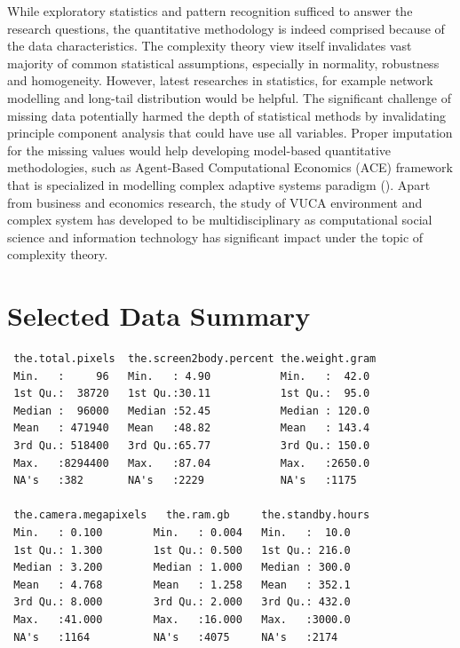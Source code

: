 \documentclass[utf8,english]{gradu3}
\begin{document}
While exploratory statistics and pattern recognition sufficed to answer the research questions, the quantitative methodology is indeed comprised because of the data characteristics. The complexity theory view itself invalidates vast majority of common statistical assumptions, especially in normality, robustness and homogeneity. However, latest researches in statistics, for example network modelling and long-tail distribution would be helpful. The significant challenge of missing data potentially harmed the depth of statistical methods by invalidating principle component analysis that could have use all variables. Proper imputation for the missing values would help developing model-based quantitative methodologies, such as Agent-Based Computational Economics (ACE) framework that is specialized in modelling complex adaptive systems paradigm (\cite{tesfatsion2003agent}). Apart from business and economics research, the study of VUCA environment and complex system has developed to be multidisciplinary as computational social science and information technology has significant impact under the topic of complexity theory.

\printbibliography

\appendix

\section{Selected Data Summary}
\label{app:data summary}
\begin{verbatim}
 the.total.pixels  the.screen2body.percent the.weight.gram 
 Min.   :     96   Min.   : 4.90           Min.   :  42.0  
 1st Qu.:  38720   1st Qu.:30.11           1st Qu.:  95.0  
 Median :  96000   Median :52.45           Median : 120.0  
 Mean   : 471940   Mean   :48.82           Mean   : 143.4  
 3rd Qu.: 518400   3rd Qu.:65.77           3rd Qu.: 150.0  
 Max.   :8294400   Max.   :87.04           Max.   :2650.0  
 NA's   :382       NA's   :2229            NA's   :1175    
 
 the.camera.megapixels   the.ram.gb     the.standby.hours
 Min.   : 0.100        Min.   : 0.004   Min.   :  10.0   
 1st Qu.: 1.300        1st Qu.: 0.500   1st Qu.: 216.0   
 Median : 3.200        Median : 1.000   Median : 300.0   
 Mean   : 4.768        Mean   : 1.258   Mean   : 352.1   
 3rd Qu.: 8.000        3rd Qu.: 2.000   3rd Qu.: 432.0   
 Max.   :41.000        Max.   :16.000   Max.   :3000.0   
 NA's   :1164          NA's   :4075     NA's   :2174     
\end{verbatim}
\end{document}
